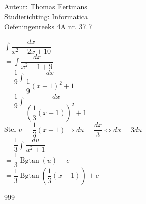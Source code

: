 \documentclass[a4paper]{article}
\newcommand{\Bgtan}{\operatorname{Bgtan}}
\begin{document}
  
\noindent \large Auteur: Thomas Eertmans \\
\noindent \large Studierichting: Informatica\\
\noindent \large Oefeningenreeks 4A nr. 37.7\\

\medskip

\normalsize

$\displaystyle\int \dfrac{dx}{x^2-2x+10}$ \\

$= \displaystyle\int \dfrac{dx}{x^2-1+9}$ \\

$= \dfrac{1}{9}\displaystyle\int \dfrac{dx}{\dfrac{1}{9}(x-1)^2+1}$ \\

$= \dfrac{1}{9} \displaystyle\int \dfrac{dx}{\left(\dfrac{1}{3}(x-1)\right)^2+1}$ \\

Stel $u = \dfrac{1}{3}(x-1)\Rightarrow du = \dfrac{dx}{3} \Leftrightarrow dx = 3du $\\

$= \dfrac{1}{3} \displaystyle\int \dfrac{du}{u^2+1}$ \\

$= \dfrac{1}{3} \Bgtan(u) +c$ \\

$= \dfrac{1}{3} \Bgtan\left(\dfrac{1}{3}(x-1)\right) +c$

\begin{thebibliography}{999}
\end{thebibliography}
\end{document}
